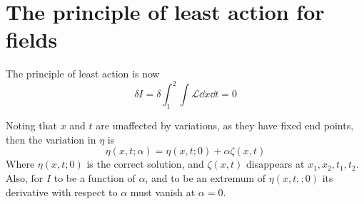 \section{The principle of least action for fields}
\label{sec:princ-least-acti}

The principle of least action is now
\begin{equation}
  \label{eq:68}
  \delta I = \delta \int_1^2 \int \mathcal{L} \dd{x} \dd{t} = 0
\end{equation}

Noting that $x$ and $t$ are unaffected by variations, as they have
fixed end points, then the variation in $\eta$ is
\begin{equation}
  \label{eq:69}
  \eta(x,t; \alpha) = \eta(x, t; 0) + \alpha \zeta(x,t)
\end{equation}
Where $\eta(x,t;0)$ is the correct solution, and $\zeta(x,t)$
disappears at $x_1, x_2, t_1, t_2$. Also, for $I$ to be a function of
$\alpha$, and to be an extremum of $\eta(x,t,;0)$ its derivative with
respect to $\alpha$ must vanish at $\alpha=0$.


